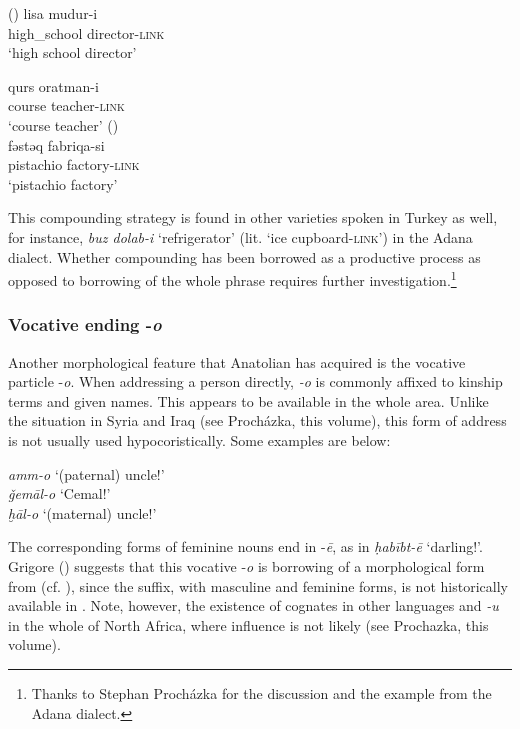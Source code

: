 \documentclass[output=paper]{langsci/langscibook}
\begin{document}
\ea \label{coms}   (\citealt[41]{AkkusBenmamoun2018})
		\ea \label{com1}\gll lisa		mudur-i\\
    high\_school director-\textsc{link} \\
        \glt `high school director'


	\ex \label{com2} \gll qurs 	oratman-i  \\
        course	teacher-\textsc{link}\\
        \glt `course teacher'
\z
      \ex \label{comt}   (\citealt[199]{Lahdo2009})\\
      \gll fəstəq fabriqa-si \\
        pistachio factory-\textsc{link}\\
        \glt `pistachio factory'
\z

\noindent This compounding strategy is found in other  varieties spoken in Turkey as well, for instance, \textit{buz dolab-i} `refrigerator' (lit. `ice cupboard-\textsc{link}') in the Adana dialect. Whether compounding has been borrowed as a productive process as opposed to borrowing of the whole phrase requires further investigation.\footnote{Thanks to Stephan Proch\'{a}zka for the discussion and the example from the Adana dialect.}



\subsubsection{Vocative ending -\textit{o}}
Another morphological feature that Anatolian  has acquired is the {vocative} particle -\textit{o}. When addressing a person directly, \textit{-o} is commonly affixed to kinship terms and given names. This appears to be available in the whole area. Unlike the situation in Syria and Iraq (see Proch\'{a}zka, this volume), this form of address is not usually used hypocoristically. Some examples are below:

\ea
\noindent \textit{amm-o} `(paternal) uncle!'\\
\textit{ǧem\={a}l-o} `Cemal!'\\
\textit{ḫāl-o} `(maternal) uncle!'\\
\z

\noindent The corresponding forms of feminine nouns end in -\textit{\={e}}, as in \textit{ḥabībt-ē} `darling!'. Grigore (\citeyear[203]{Grigore2007book}) suggests that this {vocative} -\textit{o} is borrowing of a morphological form from  (cf. \citealt{HaigÖpengin2018}), since the suffix, with masculine and feminine forms, is not historically available in . Note, however, the existence of cognates in other  languages and \textit{-u} in the whole of North Africa, where  influence is not likely (see Prochazka, this volume).
\end{document}
